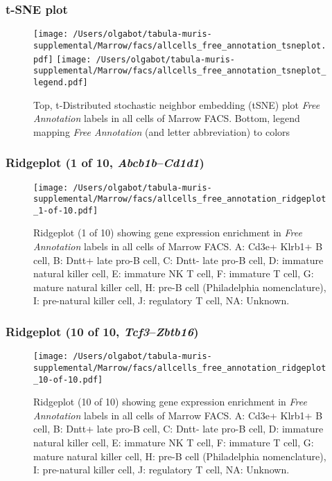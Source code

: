 \clearpage
\subsubsection{t-SNE plot}
\begin{figure}[h]
\centering
\texttt{[image: /Users/olgabot/tabula-muris-supplemental/Marrow/facs/allcells\_free\_annotation\_tsneplot.pdf]}
\texttt{[image: /Users/olgabot/tabula-muris-supplemental/Marrow/facs/allcells\_free\_annotation\_tsneplot\_legend.pdf]}
\caption{Top, t-Distributed stochastic neighbor embedding (tSNE) plot  \emph{Free Annotation} labels in all cells of Marrow FACS. Bottom, legend mapping \emph{Free Annotation} (and letter abbreviation) to colors}
\end{figure}


\clearpage

\subsubsection{Ridgeplot (1 of 10, \emph{Abcb1b}--\emph{Cd1d1})}
\begin{figure}[h]
\centering
\texttt{[image: /Users/olgabot/tabula-muris-supplemental/Marrow/facs/allcells\_free\_annotation\_ridgeplot\_1-of-10.pdf]}

\caption{ Ridgeplot (1 of 10)  showing gene expression enrichment in \emph{Free Annotation} labels in all cells of Marrow FACS. A: Cd3e+ Klrb1+ B cell, B: Dntt+ late pro-B cell, C: Dntt- late pro-B cell, D: immature natural killer cell, E: immature NK T cell, F: immature T cell, G: mature natural killer cell, H: pre-B cell (Philadelphia nomenclature), I: pre-natural killer cell, J: regulatory T cell, NA: Unknown.}
\end{figure}


\clearpage

\subsubsection{Ridgeplot (10 of 10, \emph{Tcf3}--\emph{Zbtb16})}
\begin{figure}[h]
\centering
\texttt{[image: /Users/olgabot/tabula-muris-supplemental/Marrow/facs/allcells\_free\_annotation\_ridgeplot\_10-of-10.pdf]}

\caption{ Ridgeplot (10 of 10)  showing gene expression enrichment in \emph{Free Annotation} labels in all cells of Marrow FACS. A: Cd3e+ Klrb1+ B cell, B: Dntt+ late pro-B cell, C: Dntt- late pro-B cell, D: immature natural killer cell, E: immature NK T cell, F: immature T cell, G: mature natural killer cell, H: pre-B cell (Philadelphia nomenclature), I: pre-natural killer cell, J: regulatory T cell, NA: Unknown.}
\end{figure}


